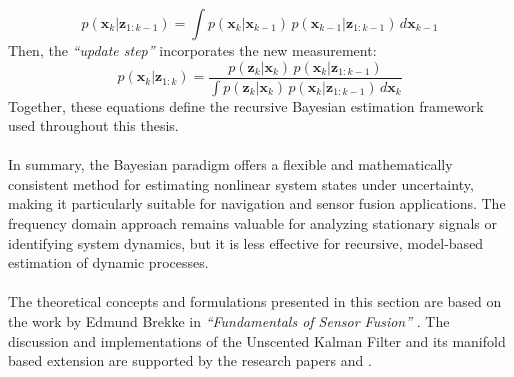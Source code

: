 $$
    p(\mathbf{x}_k | \mathbf{z}_{1:k-1}) = \int p(\mathbf{x}_k | \mathbf{x}_{k-1})\,p(\mathbf{x}_{k-1} | \mathbf{z}_{1:k-1})\,d\mathbf{x}_{k-1}
$$
Then, the \textit{``update step''} incorporates the new measurement:
$$
    p(\mathbf{x}_k | \mathbf{z}_{1:k}) =
    \frac{p(\mathbf{z}_k | \mathbf{x}_k)\,p(\mathbf{x}_k | \mathbf{z}_{1:k-1})}
    {\int p(\mathbf{z}_k | \mathbf{x}_k)\,p(\mathbf{x}_k | \mathbf{z}_{1:k-1})\,d\mathbf{x}_k}
$$
Together, these equations define the recursive Bayesian estimation framework used throughout this thesis.
\\ \\
In summary, the Bayesian paradigm offers a flexible and mathematically consistent method for estimating nonlinear system states under uncertainty, making it particularly suitable for navigation and sensor fusion applications. The frequency domain approach remains valuable for analyzing stationary signals or identifying system dynamics, but it is less effective for recursive, model-based estimation of dynamic processes.  
\\ \\
The theoretical concepts and formulations presented in this section are based on the work by Edmund Brekke in \textit{``Fundamentals of Sensor Fusion''} \cite{sensor_fusion_book}. The discussion and implementations of the Unscented Kalman Filter and its manifold based extension are supported by the research papers \cite{ukf} and \cite{ukf_manifold_code}.



